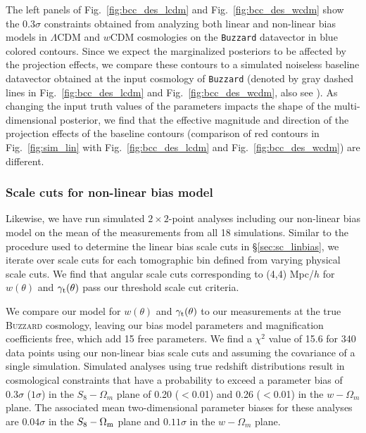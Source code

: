 \documentclass[aps, prd,twocolumn,superscriptaddress,nofootinbib,preprintnumbers]{revtex4-1}
\newcommand{\gammat}{\ensuremath{\gamma_{\rm t}(\theta)}}
\newcommand{\wtheta}{\ensuremath{w(\theta)}}
\newcommand{\buzzard}{\texttt{Buzzard} }
\newcommand{\blue}[1]{\textcolor{blue}{#1}}
\begin{document}
The left panels of Fig.~\ref{fig:bcc_des_lcdm} and Fig.~\ref{fig:bcc_des_wcdm} show the 0.3$\sigma$ constraints obtained from analyzing both linear and non-linear bias models in $\Lambda$CDM and $w$CDM cosmologies on the \buzzard datavector in blue colored contours. Since we expect the marginalized posteriors to be affected by the projection effects, we compare these contours to a simulated noiseless baseline datavector obtained at the input cosmology of \buzzard (denoted by gray dashed lines in Fig.~\ref{fig:bcc_des_lcdm} and Fig.~\ref{fig:bcc_des_wcdm}, also see \citealt{DeRose2019}). As changing the input truth values of the parameters impacts the shape of the multi-dimensional posterior, we find that the effective magnitude and direction of the projection effects of the baseline contours (comparison of red contours in  Fig.~\ref{fig:sim_lin} with Fig.~\ref{fig:bcc_des_lcdm} and Fig.~\ref{fig:bcc_des_wcdm}) are different. 

\subsubsection{Scale cuts for non-linear bias model}
Likewise, we have run simulated $2\times 2$-point analyses including our non-linear bias model on the mean of the measurements from all 18 simulations. Similar to the procedure used to determine the linear bias scale cuts in \S\ref{sec:sc_linbias}, we iterate over scale cuts for each tomographic bin defined from varying physical scale cuts. We find that angular scale cuts corresponding to (4,4) Mpc/$h$ for $\wtheta$ and $\gammat$ pass our threshold scale cut criteria.  

We compare our model for $w(\theta)$ and $\gamma_{\rm t}(\theta)$ to our measurements at the true \textsc{Buzzard} cosmology, leaving our bias model parameters and magnification coefficients free, which add 15 free parameters. We find a $\chi^2$ value of 15.6 for 340 data points using our non-linear bias scale cuts and assuming the covariance of a single simulation. Simulated analyses using true redshift distributions result in cosmological constraints that have a probability to exceed a parameter bias of $0.3\sigma$ ($1\sigma$) in the $S_8-\Omega_{m}$ plane of 0.20 ($<$0.01) and 0.26 ($<$0.01) in the $w-\Omega_{m}$ plane. The associated mean two-dimensional parameter biases for these analyses are $0.04\sigma$ in the $S_8-\Omega_{\rm m}$ plane and $0.11\sigma$ in the $w-\Omega_{m}$ plane.
\end{document}
